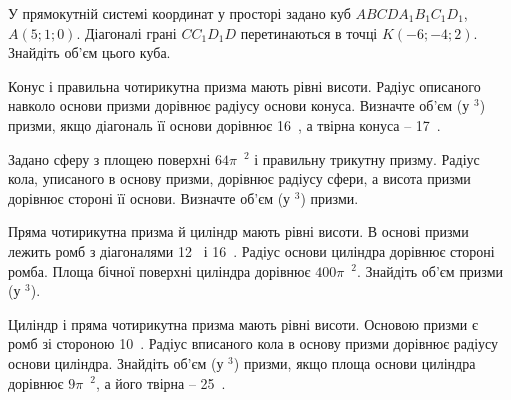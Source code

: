 \documentclass[12pt]{article}
\begin{document}
\begin{samepage}
\noindent\zadnum У прямокутній системі координат у просторі задано куб $ABCDA_1B_1C_1D_1$, $A(5; 1; 0)$. Діагоналі грані $CC_1D_1D$ перетинаються в точці $K(-6; -4; 2)$. Знайдіть об’єм цього куба. 

\nmtnobreak
\nopagebreak\nbvspace{0.5cm}
\nmtAnswerBox
\par{}
\end{samepage}

\begin{samepage}
\noindent\zadnum Конус і правильна чотирикутна призма мають рівні висоти. Радіус описаного навколо основи призми дорівнює радіусу основи конуса. Визначте об’єм (у $^3$) призми, якщо діагональ її основи дорівнює 16~, а твірна конуса – 17~. 

\nmtnobreak
\nopagebreak\nbvspace{0.5cm}
\nmtAnswerBox
\par{}
\end{samepage}

\begin{samepage}
\noindent\zadnum Задано сферу з площею поверхні $64\pi$~$^2$ і правильну трикутну призму. Радіус кола, уписаного в основу призми, дорівнює радіусу сфери, а висота призми дорівнює стороні її основи. Визначте об’єм (у $^3$) призми. 

\nmtnobreak
\nopagebreak\nbvspace{0.5cm}
\nmtAnswerBox
\par{}
\end{samepage}

\begin{samepage}
\noindent\zadnum Пряма чотирикутна призма й циліндр мають рівні висоти. В основі призми лежить ромб з діагоналями 12~ і 16~. Радіус основи циліндра дорівнює стороні ромба. Площа бічної поверхні циліндра дорівнює $400\pi$~$^2$. Знайдіть об’єм призми (у $^3$). 

\nmtnobreak
\nopagebreak\nbvspace{0.5cm}
\nmtAnswerBox
\par{}
\end{samepage}

\begin{samepage}
\noindent\zadnum Циліндр і пряма чотирикутна призма мають рівні висоти. Основою призми є ромб зі стороною 10~. Радіус вписаного кола в основу призми дорівнює радіусу основи циліндра. Знайдіть об’єм (у $^3$) призми, якщо площа основи циліндра дорівнює $9\pi$~$^2$, а його твірна – 25~. 

\nmtnobreak
\nopagebreak\nbvspace{0.5cm}
\nmtAnswerBox
\par{}
\end{samepage}
\end{document}
